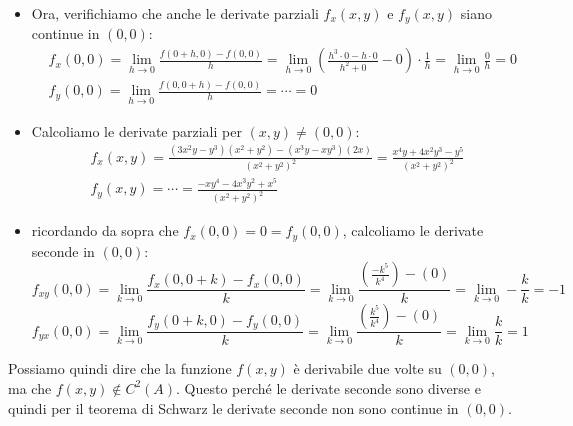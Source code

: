 \begin{itemize}
    \item Ora, verifichiamo che anche le derivate parziali \(f_x(x,y)\) e \(f_y(x,y)\) siano continue in \((0,0)\):
          \begin{align*}
               & f_x(0,0) = \lim_{ h \to 0 } \frac{f(0+h,0) - f(0,0)}{h} = \lim_{ h \to 0 } \left( \frac{h^{3}\cdot0 - h\cdot 0}{h^{2}+0} - 0 \right) \cdot \frac{1}{h} = \lim_{ h \to 0 } \frac{0}{h} = 0 \\[2mm]
               & f_y(0,0) = \lim_{ h \to 0 } \frac{f(0,0+h) - f(0,0)}{h} = \cdots = 0
          \end{align*}

          \filbreak{}
    \item Calcoliamo le derivate parziali per \((x,y) \neq (0,0)\):
          \begin{align*}
               & f_x(x,y) = \frac{(3x^{2}y-y^{3})(x^{2}+y^{2})-(x^{3}y-xy^{3})(2x)}{{(x^{2}+y^{2})}^{2}} = \frac{x^{4}y+4x^{2}y^{3}-y^{5}}{{(x^{2}+y^{2})}^{2}} \\[2mm]
               & f_y(x,y) = \cdots = \frac{-xy^{4}-4x^{3}y^{2}+x^{5}}{{(x^{2}+y^{2})}^{2}}
          \end{align*}

    \item ricordando da sopra che \(f_x(0,0)=0=f_y(0,0)\), calcoliamo le derivate seconde in \((0,0)\):
          \[
              f_{xy} (0,0) = \lim_{ k \to 0 } \frac{f_x(0,0+k) - f_x(0,0)}{k} = \lim_{ k \to 0 } \frac{ \left( \frac{-k^{5}}{k^{4}} \right) - (0)}{k} = \lim_{ k \to 0 } - \frac{k}{k} = -1
          \]
          \[
              f_{yx}(0,0) = \lim_{ k \to 0 } \frac{f_y(0+k,0) - f_y(0,0)}{k} = \lim_{ k \to 0 } \frac{ \left( \frac{k^{5}}{k^{4}} \right) - (0)}{k} = \lim_{ k \to 0 } \frac{k}{k} = 1
          \]
\end{itemize}

Possiamo quindi dire che la funzione \(f(x,y)\) è derivabile due volte su \((0,0)\), ma che \(f(x,y) \notin C^2(A)\). Questo perché le derivate seconde sono diverse e quindi per il teorema di Schwarz le derivate seconde non sono continue in \((0,0)\).
